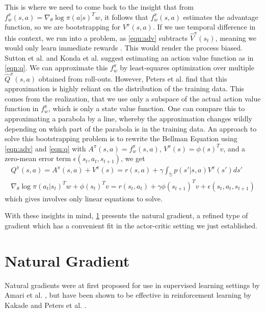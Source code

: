 This is where we need to come back to the insight that from $f_w^\pi(s,a) = {\nabla_\theta \log\pi(a|s)}^T w$, it follows that $f_w^\pi(s,a)$ estimates the advantage function, so we are bootstrapping for $V^\pi(s,a)$. If we use temporal difference in this context, we run into a problem, as \eqref{eqn:adv} subtracts $\hat{V}^\pi(s_t)$, meaning we would only learn immediate rewards \cite{Peters_IICHR_2003}. This would render the process biased. Sutton et al. \cite{Sutton:1999:PGM:3009657.3009806} and Konda et al. \cite{NIPS1999_1786} suggest estimating an action value function as in \eqref{eqn:q}. We can approximate this $f_w^\pi$ by least-squares optimization over multiple $\hat{Q}^\pi(s,a)$ obtained from roll-outs. However, Peters et al. \cite{4863} find that this approximation is highly reliant on the distribution of the training data. This comes from the realization, that we use only a subspace of the actual action value function in $f_w^\pi$, which is only a state value function. One can compare this to approximating a parabola by a line, whereby the approximation changes wildly depending on which part of the parabola is in the training data. An approach to solve this bootstrapping problem is to rewrite the Bellman Equation using \eqref{eqn:adv} and \eqref{eqn:q} with $A^\pi(s,a) = f_w^\pi(s,a)$, $V^\pi(s) = \phi(s)^T v$, and a zero-mean error term $\epsilon(s_t,a_t,s_{t+1})$, we get
\begin{align}
  Q^\pi(s,a) = A^\pi(s,a) + V^\pi(s) = r(s,a) + \gamma \int_\mathbb{S} p(s'|s,a)V^\pi(s')ds' \\
  \nabla_\theta \log \pi(a_t|s_t)^T w + \phi(s_t)^T v = r(s_t,a_t) + \gamma \phi(s_{t+1})^T v + \epsilon(s_t,a_t,s_{t+1})
\end{align}
which gives involves only linear equations to solve. \cite{4863} 

With these insights in mind, \ref{sec:natural} presents the natural gradient, a refined type of gradient which has a convenient fit in the actor-critic setting we just established.

\section{Natural Gradient}
\label{sec:natural}

Natural gradients were at first proposed for use in supervised learning settings by Amari et al. \cite{Amari:1998:NGW:287476.287477}, but have been shown to be effective in reinforcement learning by Kakade \cite{Kakade:2001} and Peters et al. \cite{4863}.

